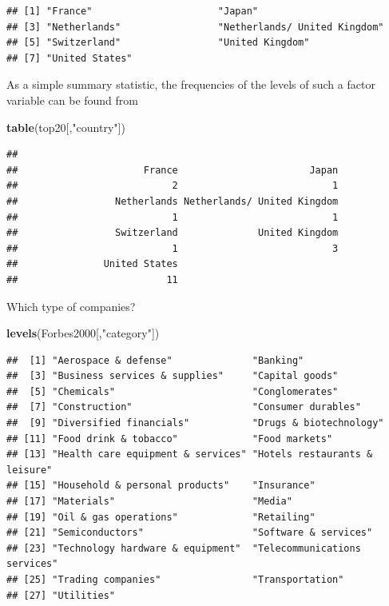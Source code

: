 \documentclass[]{article}
\newenvironment{Shaded}{\begin{snugshade}}{\end{snugshade}}
\newcommand{\KeywordTok}[1]{\textcolor[rgb]{0.13,0.29,0.53}{\textbf{{#1}}}}
\newcommand{\StringTok}[1]{\textcolor[rgb]{0.31,0.60,0.02}{{#1}}}
\newcommand{\NormalTok}[1]{{#1}}
\numberwithin{equation}{section}
\begin{document}
\begin{verbatim}
## [1] "France"                      "Japan"                      
## [3] "Netherlands"                 "Netherlands/ United Kingdom"
## [5] "Switzerland"                 "United Kingdom"             
## [7] "United States"
\end{verbatim}

As a simple summary statistic, the frequencies of the levels of such a
factor variable can be found from

\begin{Shaded}
\begin{Highlighting}[]
\KeywordTok{table}\NormalTok{(top20[,}\StringTok{"country"}\NormalTok{])}
\end{Highlighting}
\end{Shaded}

\begin{verbatim}
## 
##                      France                       Japan 
##                           2                           1 
##                 Netherlands Netherlands/ United Kingdom 
##                           1                           1 
##                 Switzerland              United Kingdom 
##                           1                           3 
##               United States 
##                          11
\end{verbatim}

Which type of companies?

\begin{Shaded}
\begin{Highlighting}[]
\KeywordTok{levels}\NormalTok{(Forbes2000[,}\StringTok{"category"}\NormalTok{])}
\end{Highlighting}
\end{Shaded}

\begin{verbatim}
##  [1] "Aerospace & defense"              "Banking"                         
##  [3] "Business services & supplies"     "Capital goods"                   
##  [5] "Chemicals"                        "Conglomerates"                   
##  [7] "Construction"                     "Consumer durables"               
##  [9] "Diversified financials"           "Drugs & biotechnology"           
## [11] "Food drink & tobacco"             "Food markets"                    
## [13] "Health care equipment & services" "Hotels restaurants & leisure"    
## [15] "Household & personal products"    "Insurance"                       
## [17] "Materials"                        "Media"                           
## [19] "Oil & gas operations"             "Retailing"                       
## [21] "Semiconductors"                   "Software & services"             
## [23] "Technology hardware & equipment"  "Telecommunications services"     
## [25] "Trading companies"                "Transportation"                  
## [27] "Utilities"
\end{verbatim}
\end{document}
